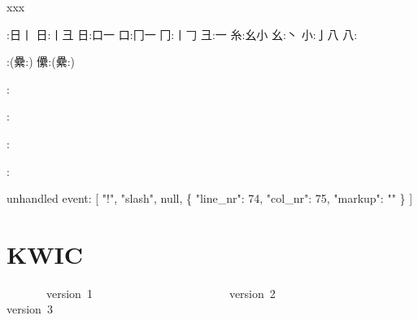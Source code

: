 \begin{multicols}{2}
\endgroup{}xxx\mktsShowpar\par
\begingroup\mktsObeyAllLines{}

\begingroup{}:{\cjk{}日丨} 
{\cjk{}日}:{\cjk{}丨彐} 
{\cjk{}日}:{\cjk{}口一} 
{\cjk{}口}:{\cjk{}冂一} 
{\cjk{}冂}:{\cjk{}丨{\cnxb{}𠃌}} 
{\cjk{}彐}:{一} 
{\cjk{}糸}:{\cjk{}幺小} 
{\cjk{}幺}:{丶} 
{\cjk{}小}:{\cjk{}亅八} 
{\cjk{}八}:{\cjk{}} 
\endgroup{}{}

\endgroup{}\begingroup\mktsObeyAllLines{}

\begingroup{}:({\cjk{}纍}:)
{\cjk{}儽}:({\cjk{}纍}:)
\endgroup{}{}

\endgroup{}\begingroup\mktsObeyAllLines{}

\begingroup{}:
\endgroup{}{}

\endgroup{}\begingroup\mktsObeyAllLines{}

\begingroup{}:
\endgroup{}{}

\endgroup{}\begingroup\mktsObeyAllLines{}

\begingroup{}:
\endgroup{}{}

\endgroup{}\begingroup\mktsObeyAllLines{}

\begingroup{}:
\endgroup{}{}

\endgroup{}\begin{mktsEnvWarning}unhandled event: [
 "!",
 "slash",
 null,
 \{
  "line\_nr": 74,
  "col\_nr": 75,
  "markup": ""
 \}
]\end{mktsEnvWarning}\end{multicols}
\section{KWIC
}
\begin{multicols}{2}\end{multicols}\begingroup\mktsObeyAllLines{}

\begingroup\mktsStyleCode{}       version 1                        version 2                        version 3

